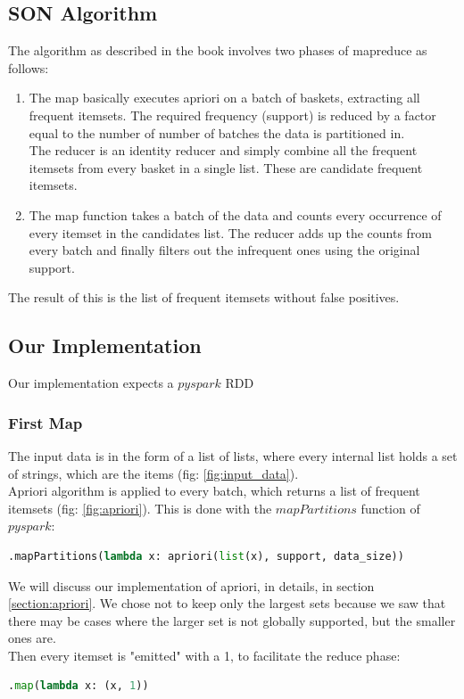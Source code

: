 \documentclass[a4paper]{article}
\begin{document}
	\subsection{SON Algorithm}	
	The algorithm as described in the book involves two phases of mapreduce as follows:
	\begin{enumerate}
	\item The map basically executes apriori on a batch of baskets, extracting all frequent itemsets. The required frequency (support) is reduced by a factor equal to the number of number of batches the data is partitioned in.\\
	The reducer is an identity reducer and simply combine all the frequent itemsets from every basket in a single list. These are candidate frequent itemsets.
	\item The map function takes a batch of the data and counts every occurrence of every itemset in the candidates list. The reducer adds up the counts from every batch and finally filters out the infrequent ones using the original support.
	\end{enumerate}
	The result of this is the list of frequent itemsets without false positives.
	
	\subsection{Our Implementation}
	Our implementation expects a $pyspark$ RDD\\
	
	\subsubsection{First Map}
	The input data is in the form of a list of lists, where every internal list holds a set of strings, which are the items (fig: \ref{fig:input_data}).\\
	
	Apriori algorithm is applied to every batch, which returns a list of frequent itemsets (fig: \ref{fig:apriori}). This is done with the $mapPartitions$ function of $pyspark$: 
	\begin{lstlisting}[language=Python]
.mapPartitions(lambda x: apriori(list(x), support, data_size))
	\end{lstlisting}	
	We will discuss our implementation of apriori, in details, in section \ref{section:apriori}. We chose not to keep only the largest sets because we saw that there may be cases where the larger set is not globally supported, but the smaller ones are.\\
	Then every itemset is "emitted" with a 1, to facilitate the reduce phase:
	\begin{lstlisting}[language=Python]
.map(lambda x: (x, 1))
	\end{lstlisting}
	
\end{document}
